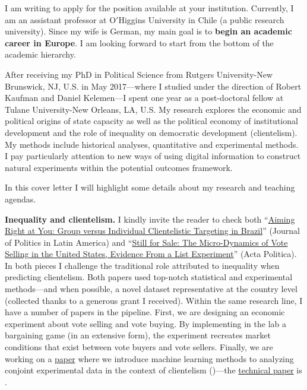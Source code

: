 \vspace{-0.3cm}I am writing to apply for the position available at your institution. Currently, I am an assistant professor at O$'$Higgins University in Chile (a public research university). Since my wife is German, my main goal is to {\bf begin an academic career in Europe}. I am looking forward to start from the bottom of the academic hierarchy. 

After receiving my PhD in Political Science from Rutgers University-New Brunswick, NJ, U.S. in May 2017---where I studied under the direction of Robert Kaufman and Daniel Kelemen---I spent one year as a post-doctoral fellow at Tulane University-New Orleans, LA, U.S. My research explores the economic and political origins of state capacity as well as the political economy of institutional development and the role of inequality on democratic development (clientelism). My methods include historical analyses, quantitative and experimental methods. I pay particularly attention to new ways of using digital information to construct natural experiments within the potential outcomes framework. 

In this cover letter I will highlight some details about my research and teaching agendas.



{\bf Inequality and clientelism.} I kindly invite the reader to check both ``\href{https://journals.sub.uni-hamburg.de/giga/jpla/article/view/1121/1128}{Aiming Right at You: Group versus Individual Clientelistic Targeting in Brazil}'' (Journal of Politics in Latin America) and ``\href{https://doi.org/10.1057/s41269-020-00174-4}{Still for Sale: The Micro-Dynamics of Vote Selling in the United States, Evidence From a List Experiment}'' (Acta Politica). In both pieces I challenge the traditional role attributed to inequality when predicting clientelism. Both papers used top-notch statistical and experimental methods---and when possible, a novel dataset representative at the country level (collected thanks to a generous grant I received). Within the same research line, I have a number of papers in the pipeline. First, we are designing an economic experiment about vote selling and vote buying. By implementing in the lab a bargaining game (in an extensive form), the experiment recreates market conditions that exist between vote buyers and vote sellers. Finally, we are working on a \href{https://github.com/hbahamonde/Conjoint_US/raw/master/Bahamonde_Quininao_Conjoint.pdf}{paper} where we introduce machine learning methods to analyzing conjoint experimental data in the context of clientelism ({\unskip})---the \href{https://github.com/hbahamonde/Conjoint_US/raw/master/Bahamonde_Quininao_Conjoint_Letter_PA.pdf}{technical paper} is {\unskip}.



